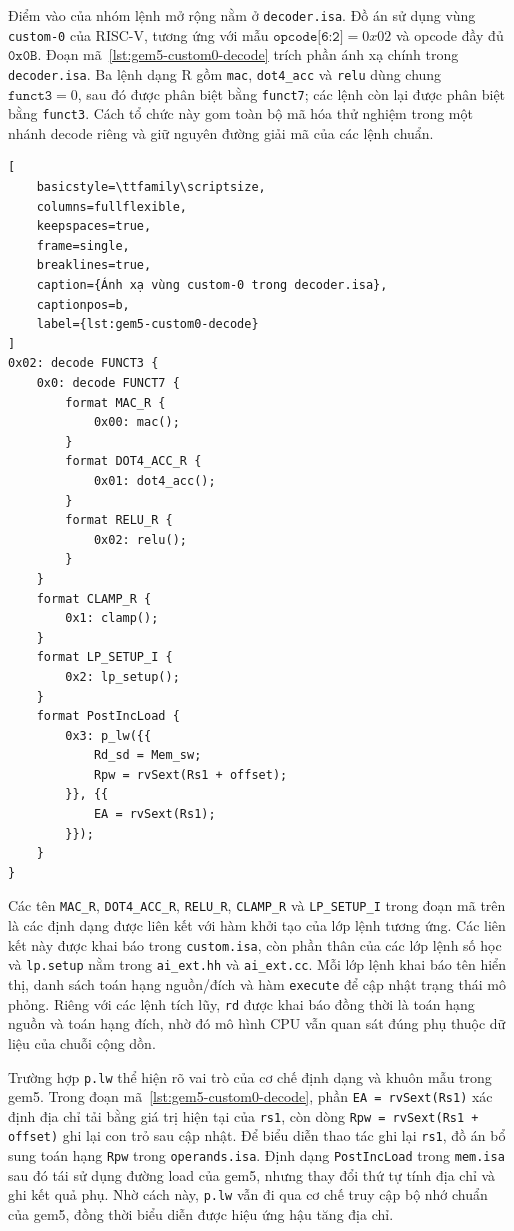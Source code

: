 \documentclass[../DoAn.tex]{subfiles}
\begin{document}
Điểm vào của nhóm lệnh mở rộng nằm ở \texttt{decoder.isa}. Đồ án sử dụng vùng \texttt{custom-0} của RISC-V, tương ứng với mẫu \(\texttt{opcode[6:2]}=0x02\) và opcode đầy đủ \(\texttt{0x0B}\). Đoạn mã~\ref{lst:gem5-custom0-decode} trích phần ánh xạ chính trong \texttt{decoder.isa}. Ba lệnh dạng R gồm \texttt{mac}, \texttt{dot4\_acc} và \texttt{relu} dùng chung \(\texttt{funct3}=0\), sau đó được phân biệt bằng \texttt{funct7}; các lệnh còn lại được phân biệt bằng \texttt{funct3}. Cách tổ chức này gom toàn bộ mã hóa thử nghiệm trong một nhánh decode riêng và giữ nguyên đường giải mã của các lệnh chuẩn.

\begin{lstlisting}[
    basicstyle=\ttfamily\scriptsize,
    columns=fullflexible,
    keepspaces=true,
    frame=single,
    breaklines=true,
    caption={Ánh xạ vùng custom-0 trong decoder.isa},
    captionpos=b,
    label={lst:gem5-custom0-decode}
]
0x02: decode FUNCT3 {
    0x0: decode FUNCT7 {
        format MAC_R {
            0x00: mac();
        }
        format DOT4_ACC_R {
            0x01: dot4_acc();
        }
        format RELU_R {
            0x02: relu();
        }
    }
    format CLAMP_R {
        0x1: clamp();
    }
    format LP_SETUP_I {
        0x2: lp_setup();
    }
    format PostIncLoad {
        0x3: p_lw({{
            Rd_sd = Mem_sw;
            Rpw = rvSext(Rs1 + offset);
        }}, {{
            EA = rvSext(Rs1);
        }});
    }
}
\end{lstlisting}

Các tên \texttt{MAC\_R}, \texttt{DOT4\_ACC\_R}, \texttt{RELU\_R}, \texttt{CLAMP\_R} và \texttt{LP\_SETUP\_I} trong đoạn mã trên là các định dạng được liên kết với hàm khởi tạo của lớp lệnh tương ứng. Các liên kết này được khai báo trong \texttt{custom.isa}, còn phần thân của các lớp lệnh số học và \texttt{lp.setup} nằm trong \texttt{ai\_ext.hh} và \texttt{ai\_ext.cc}. Mỗi lớp lệnh khai báo tên hiển thị, danh sách toán hạng nguồn/đích và hàm \texttt{execute} để cập nhật trạng thái mô phỏng. Riêng với các lệnh tích lũy, \texttt{rd} được khai báo đồng thời là toán hạng nguồn và toán hạng đích, nhờ đó mô hình CPU vẫn quan sát đúng phụ thuộc dữ liệu của chuỗi cộng dồn.

Trường hợp \texttt{p.lw} thể hiện rõ vai trò của cơ chế định dạng và khuôn mẫu trong gem5. Trong đoạn mã~\ref{lst:gem5-custom0-decode}, phần \texttt{EA = rvSext(Rs1)} xác định địa chỉ tải bằng giá trị hiện tại của \texttt{rs1}, còn dòng \texttt{Rpw = rvSext(Rs1 + offset)} ghi lại con trỏ sau cập nhật. Để biểu diễn thao tác ghi lại \texttt{rs1}, đồ án bổ sung toán hạng \texttt{Rpw} trong \texttt{operands.isa}. Định dạng \texttt{PostIncLoad} trong \texttt{mem.isa} sau đó tái sử dụng đường load của gem5, nhưng thay đổi thứ tự tính địa chỉ và ghi kết quả phụ. Nhờ cách này, \texttt{p.lw} vẫn đi qua cơ chế truy cập bộ nhớ chuẩn của gem5, đồng thời biểu diễn được hiệu ứng hậu tăng địa chỉ.
\end{document}
